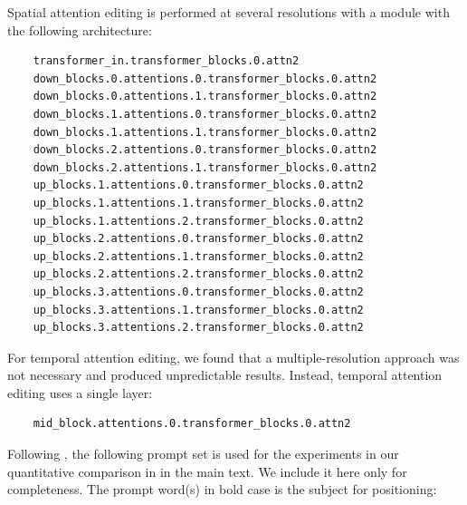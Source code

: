 Spatial attention editing is performed at several resolutions with a module with the following architecture:
\begin{footnotesize}
\begin{small}\begin{verbatim}
    transformer_in.transformer_blocks.0.attn2
    down_blocks.0.attentions.0.transformer_blocks.0.attn2
    down_blocks.0.attentions.1.transformer_blocks.0.attn2
    down_blocks.1.attentions.0.transformer_blocks.0.attn2
    down_blocks.1.attentions.1.transformer_blocks.0.attn2
    down_blocks.2.attentions.0.transformer_blocks.0.attn2
    down_blocks.2.attentions.1.transformer_blocks.0.attn2
    up_blocks.1.attentions.0.transformer_blocks.0.attn2
    up_blocks.1.attentions.1.transformer_blocks.0.attn2
    up_blocks.1.attentions.2.transformer_blocks.0.attn2
    up_blocks.2.attentions.0.transformer_blocks.0.attn2
    up_blocks.2.attentions.1.transformer_blocks.0.attn2
    up_blocks.2.attentions.2.transformer_blocks.0.attn2
    up_blocks.3.attentions.0.transformer_blocks.0.attn2
    up_blocks.3.attentions.1.transformer_blocks.0.attn2
    up_blocks.3.attentions.2.transformer_blocks.0.attn2
\end{verbatim}\end{small}
\end{footnotesize}

For temporal attention editing, we found that a multiple-resolution approach was not necessary and produced unpredictable results. Instead, temporal attention editing uses a single layer:
\begin{footnotesize}
\begin{verbatim}
    mid_block.attentions.0.transformer_blocks.0.attn2
\end{verbatim}
\end{footnotesize}


Following \cite{jain2023peekaboo}, the following prompt set is used for the experiments in our quantitative comparison in  in the main text. We include it here only for completeness. The prompt word(s) in bold case is the subject for positioning: 

